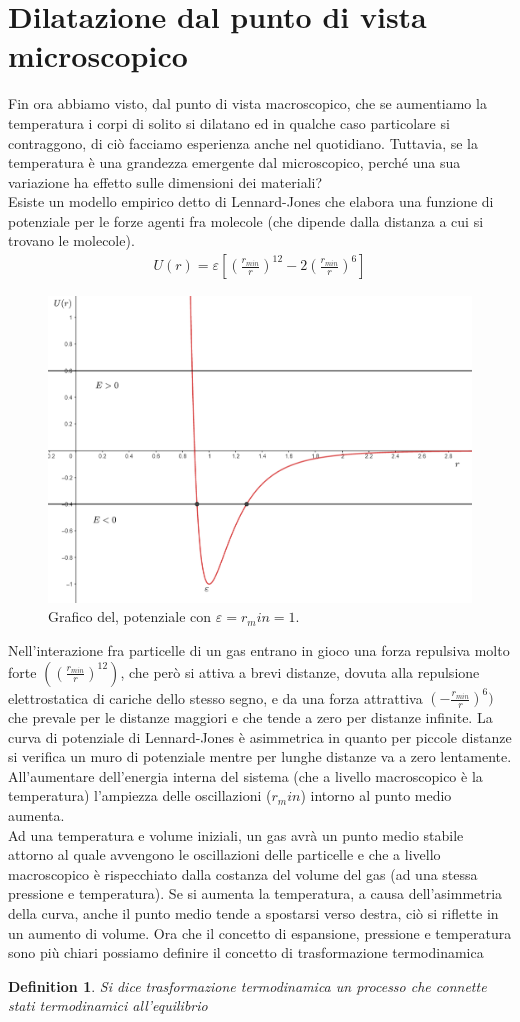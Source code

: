 \documentclass[10pt,a4paper]{article}
\newtheorem{definition}{Definition}
\begin{document}
\section{Dilatazione dal punto di vista microscopico}
Fin ora abbiamo visto, dal punto di vista macroscopico, che se aumentiamo la temperatura i corpi di solito si dilatano ed in qualche caso particolare si contraggono, di ciò facciamo esperienza anche nel quotidiano. Tuttavia, se la temperatura è una grandezza emergente dal microscopico, perché una sua variazione ha effetto sulle dimensioni dei materiali?\\
Esiste un modello empirico detto di Lennard-Jones che elabora una funzione di potenziale per le forze agenti fra molecole (che dipende dalla distanza a cui si trovano le molecole). 
\begin{align*}
	U(r) = \varepsilon[(\frac{r_{min}}{r})^{12}-2(\frac{r_{min}}{r})^6]
\end{align*}
\begin{figure}[h!]
	\centering
	\includegraphics[width=0.6\linewidth]{../images/../images/Lennard-Jones_model}
	\caption{Grafico del, potenziale con $\varepsilon =r_min = 1$.}
	\label{fig:lennard-jonesmodel}
\end{figure}
\FloatBarrier
Nell'interazione fra particelle di un gas entrano in gioco una forza repulsiva molto forte $((\frac{r_{min}}{r})^{12})$, che però si attiva a brevi distanze, dovuta alla repulsione elettrostatica di cariche dello stesso segno, e da una forza attrattiva $(-\frac{r_{min}}{r})^6)$ che prevale per le distanze maggiori e che tende a zero per distanze infinite. La curva di potenziale di Lennard-Jones è asimmetrica in quanto per piccole distanze si verifica un muro di potenziale mentre per lunghe distanze va a zero lentamente. All'aumentare dell'energia interna del sistema (che a livello macroscopico è la temperatura) l'ampiezza delle oscillazioni ($r_min$) intorno al punto medio aumenta.\\
Ad una temperatura e volume iniziali, un gas avrà un punto medio stabile attorno al quale avvengono le oscillazioni delle particelle e che a livello macroscopico è rispecchiato dalla costanza del volume del gas (ad una stessa pressione e temperatura). Se si aumenta la temperatura, a causa dell'asimmetria della curva, anche il punto medio tende a spostarsi verso destra, ciò si riflette in un aumento di volume. Ora che il concetto di espansione, pressione e temperatura sono più chiari possiamo definire il concetto di trasformazione termodinamica
\begin{definition}
	Si dice trasformazione termodinamica un processo che connette stati termodinamici all'equilibrio
\end{definition}
\end{document}
